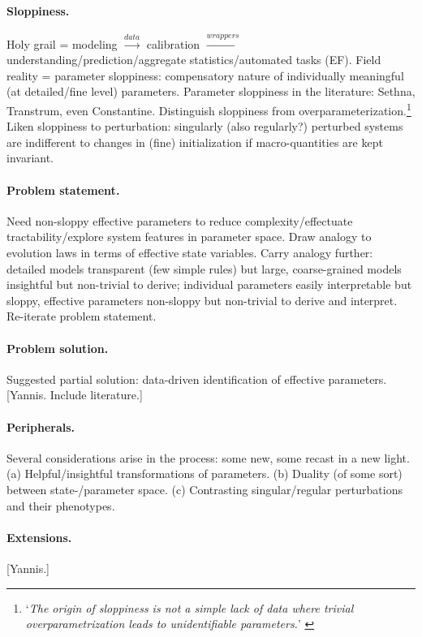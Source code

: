 \documentclass{article}
\begin{document}
{\color{gray}
\paragraph{Sloppiness.}
Holy grail = modeling $\xrightarrow{data}$ calibration
$\xrightarrow{wrappers}$ understanding/prediction/aggregate
statistics/automated tasks (EF).
Field reality = parameter sloppiness:
compensatory nature of individually meaningful
(at detailed/fine level) parameters.
Parameter sloppiness in the literature:
Sethna, Transtrum, even Constantine.
Distinguish sloppiness from overparameterization.\footnote{`{\it The
origin of sloppiness is not a simple lack of data
where trivial overparametrization leads to unidentifiable parameters.}'
\cite{WCGBMBES06}}
Liken sloppiness to perturbation:
singularly (also regularly?) perturbed systems
are indifferent to changes in (fine) initialization
if macro-quantities are kept invariant.

\paragraph{Problem statement.}
Need non-sloppy effective parameters
to reduce complexity/effectuate tractability/explore system features
in parameter space.
Draw analogy to evolution laws in terms of effective state variables.
Carry analogy further:
detailed models transparent (few simple rules) but large,
coarse-grained models insightful but non-trivial to derive;
individual parameters easily interpretable but sloppy,
effective parameters non-sloppy but non-trivial to derive and interpret.
Re-iterate problem statement.

\paragraph{Problem solution.}
Suggested partial solution: data-driven identification of effective parameters.
[Yannis. Include literature.]

\paragraph{Peripherals.}
Several considerations arise in the process:
some new, some recast in a new light.
(a) Helpful/insightful transformations of parameters.
(b) Duality (of some sort) between state-/parameter space.
(c) Contrasting singular/regular perturbations and their phenotypes.

\paragraph{Extensions.}
[Yannis.]
}
\end{document}
